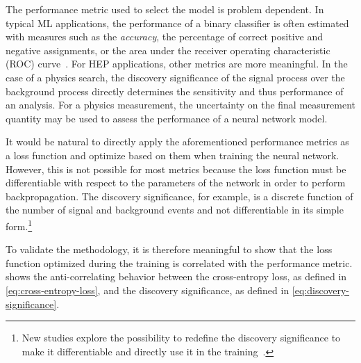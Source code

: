 The performance metric used to select the model is problem dependent.
In typical ML applications, the performance of a binary classifier is often estimated with measures such as the \emph{accuracy}, the percentage of correct positive and negative assignments, or the area under the receiver operating characteristic (ROC) curve~\cite{BRADLEY19971145}. 
For HEP applications, other metrics are more meaningful. In the case of a physics search, the discovery significance of the signal process over the background process directly determines the sensitivity and thus performance of an analysis. 
For a physics measurement, the uncertainty on the final measurement quantity may be used to assess the performance of a neural network model.

It would be natural to directly apply the aforementioned performance metrics as a loss function and optimize based on them when training the neural network.
However, this is not possible for most metrics because the loss function must be differentiable with respect to the parameters of the network in order to perform backpropagation. The discovery significance, for example, is a discrete function of the number of signal and background events and not differentiable in its simple form.\footnote{New studies explore the possibility to redefine the discovery significance to make it differentiable and directly use it in the training~\cite{ELWOODZ0INML}.}

To validate the methodology, it is therefore meaningful to show that the loss function optimized during the training is correlated with the performance metric. 
 shows the anti-correlating behavior between the cross-entropy loss, as defined in \cref{eq:cross-entropy-loss}, and the discovery significance, as defined in \cref{eq:discovery-significance}.


